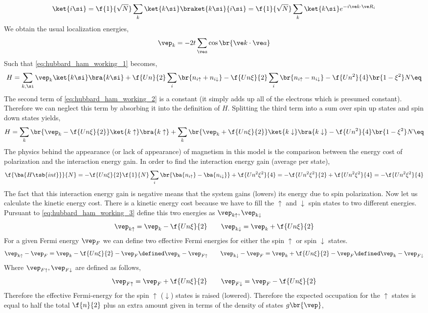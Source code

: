 \documentclass{article}
\newcommand{\uu}{\uparrow}
\newcommand{\dd}{\downarrow}
\begin{document}
\[ \ket{i \si} = \f{1}{\sqrt{N}} \sum_{k} \ket{k \si} \braket{k \si}{i \si} = \f{1}{\sqrt{N}} \sum_{k} \ket{k \si} e^{- i \ve k \cdot \ve R_i} \]
We obtain the usual localization energies,
\[ \vep_k = - 2 t \sum_{\ve a} \cos \br{\ve k \cdot \ve a} \]
Such that \cref{eq:hubbard_ham_working_1} becomes,
\[ H = \sum_{k,\si} \vep_k \ket{k \si}\bra{k \si} + \f{Un}{2} \sum_{i} \br{n_{i \uu} + n_{i \dd}} - \f{Un\xi}{2} \sum_{i} \br{n_{i \uu} - n_{i \dd}} - \f{Un^2}{4} \br{1 - \xi^2} N \eq \label{eq:hubbard_ham_working_2}\]
The second term of \cref{eq:hubbard_ham_working_2} is a constant (it simply adds up all of the electrons which is presumed constant). Therefore we can neglect this term by absorbing it into the definition of $H$. Splitting the third term into a sum over spin up states and spin down states yields,
\[ H = \sum_{k} \br{\vep_k - \f{Un \xi}{2}} \ket{k \uu}\bra{k \uu} + \sum_{k} \br{\vep_k + \f{Un \xi}{2}} \ket{k \dd}\bra{k \dd} - \f{Un^2}{4} \br{1 - \xi^2} N \eq \label{eq:hubbard_ham_working_3}\]
The physics behind the appearance (or lack of appearance) of magnetism in this model is the comparison between the energy cost of polarization and the interaction energy gain. In order to find the interaction energy gain (average per state),
\[ \f{\ba{H\tsb{int}}}{N} = - \f{U n \xi}{2} \f{1}{N} \sum_{i} \br{\ba{n_{i \uu}} - \ba{n_{i \dd}}} + \f{U n^2 \xi^2}{4} = -\f{U n^2 \xi^2}{2} + \f{U n^2 \xi^2}{4} = -\f{U n^2 \xi^2}{4} \]
The fact that this interaction energy gain is negative means that the system gains (lowers) its energy due to spin polarization. Now let us calculate the kinetic energy cost. There is a kinetic energy cost because we have to fill the $\uu$ and $\dd$ spin states to two different energies. Pursuant to \cref{eq:hubbard_ham_working_3} define this two energies as $\vep_{k \uu}, \vep_{k \dd}$
\[ \vep_{k \uu} = \vep_k - \f{U n \xi}{2} \qquad \vep_{k \dd} = \vep_k + \f{U n \xi}{2} \]
For a given Fermi energy $\vep_F$ we can define two effective Fermi energies for either the spin $\uu$ or spin $\dd$ states.
\[ \vep_{k \uu} - \vep_F = \vep_k - \f{U n \xi}{2} - \vep_F \defined \vep_k - \vep_{F\uu} \qquad \vep_{k \dd} - \vep_F = \vep_k + \f{U n \xi}{2} - \vep_F \defined \vep_k - \vep_{F\dd} \]
Where $\vep_{F\uu}, \vep_{F\dd}$ are defined as follows,
\[ \vep_{F \uu} = \vep_F + \f{U n \xi}{2} \qquad \vep_{F \dd} = \vep_F - \f{U n \xi}{2} \]
Therefore the effective Fermi-energy for the spin $\uu$ ($\dd$) states is raised (lowered). Therefore the expected occupation for the $\uu$ states is equal to half the total $\f{n}{2}$ plus an extra amount given in terms of the density of states $g\br{\vep}$,
\end{document}
